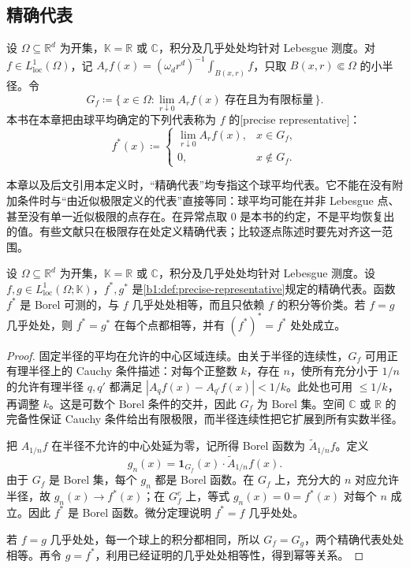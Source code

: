 \subsection{精确代表}
\label{b1:subsec:140402}

\begin{definition}\label{b1:def:precise-representative}
设 \(\Omega\subseteq\mathbb R^d\) 为开集，\(\mathbb K=\mathbb R\) 或 \(\mathbb C\)，积分及几乎处处均针对 Lebesgue 测度。对 \(f\in L^1_{\mathrm{loc}}(\Omega)\)，记 \(A_rf(x)=(\omega_dr^d)^{-1}\int_{B(x,r)}f\)，只取 \(B(x,r)\Subset\Omega\) 的小半径。令
\[
 G_f\coloneqq\{\,x\in\Omega:\lim_{r\downarrow0}A_rf(x)
                    \text{ 存在且为有限标量}\,\}.
\]
本书在本章把由球平均确定的下列代表称为 \(f\) 的[precise representative]：
\[
 f^*(x)\coloneqq
 \begin{cases}
 \displaystyle\lim_{r\downarrow0}A_rf(x),&x\in G_f,\\
 0,&x\notin G_f.
 \end{cases}
\]
\end{definition}

本章以及后文引用本定义时，“精确代表”均专指这个球平均代表。它不能在没有附加条件时与“由近似极限定义的代表”直接等同：球平均可能在并非 Lebesgue 点、甚至没有单一近似极限的点存在。在异常点取 \(0\) 是本书的约定，不是平均恢复出的值。有些文献只在极限存在处定义精确代表；比较逐点陈述时要先对齐这一范围。

\begin{proposition}\label{b1:prop:precise-representative}
设 \(\Omega\subseteq\mathbb R^d\) 为开集，\(\mathbb K=\mathbb R\) 或 \(\mathbb C\)，积分及几乎处处均针对 Lebesgue 测度。设 \(f,g\in L^1_{\mathrm{loc}}(\Omega;\mathbb K)\)，\(f^*,g^*\) 是\cref{b1:def:precise-representative}规定的精确代表。函数 \(f^*\) 是 Borel 可测的，与 \(f\) 几乎处处相等，而且只依赖 \(f\) 的积分等价类。若 \(f=g\) 几乎处处，则 \(f^*=g^*\) 在每个点都相等，并有 \((f^*)^*=f^*\) 处处成立。
\end{proposition}
\begin{proof}
固定半径的平均在允许的中心区域连续。由关于半径的连续性，\(G_f\) 可用正有理半径上的 Cauchy 条件描述：对每个正整数 \(k\)，存在 \(n\)，使所有充分小于 \(1/n\) 的允许有理半径 \(q,q'\) 都满足 \(|A_qf(x)-A_{q'}f(x)|<1/k\)。此处也可用 \(\leq1/k\)，再调整 \(k\)。这是可数个 Borel 条件的交并，因此 \(G_f\) 为 Borel 集。空间 \(\mathbb C\) 或 \(\mathbb R\) 的完备性保证 Cauchy 条件给出有限极限，而半径连续性把它扩展到所有实数半径。

把 \(A_{1/n}f\) 在半径不允许的中心处延为零，记所得 Borel 函数为 \(\widetilde A_{1/n}f\)。定义
\[
 g_n(x)=\mathbf1_{G_f}(x)\cdot\widetilde A_{1/n}f(x).
\]
由于 \(G_f\) 是 Borel 集，每个 \(g_n\) 都是 Borel 函数。在 \(G_f\) 上，充分大的 \(n\) 对应允许半径，故 \(g_n(x)\to f^*(x)\)；在 \(G_f^c\) 上，等式 \(g_n(x)=0=f^*(x)\) 对每个 \(n\) 成立。因此 \(f^*\) 是 Borel 函数。微分定理说明 \(f^*=f\) 几乎处处。

若 \(f=g\) 几乎处处，每一个球上的积分都相同，所以 \(G_f=G_g\)，两个精确代表处处相等。再令 \(g=f^*\)，利用已经证明的几乎处处相等性，得到幂等关系。
\end{proof}


